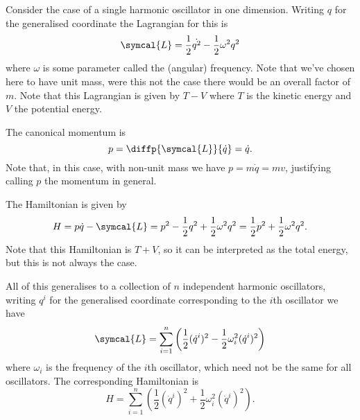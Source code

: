\documentclass[fleqn]{NotesClass}
\newcommand{\lagrangian}{\symcal{L}}
\begin{document}
    \begin{exm}{}{}
        Consider the case of a single harmonic oscillator in one dimension.
        Writing \(q\) for the generalised coordinate the Lagrangian for this is
        \begin{equation}
            \lagrangian = \frac{1}{2}\dot{q^2} - \frac{1}{2}\omega^2 q^2
        \end{equation}
        where \(\omega\) is some parameter called the (angular) frequency.
        Note that we've chosen here to have unit mass, were this not the case there would be an overall factor of \(m\).
        Note that this Lagrangian is given by \(T - V\) where \(T\) is the kinetic energy and \(V\) the potential energy.
        
        The canonical momentum is
        \begin{equation}
            p = \diffp{\lagrangian}{\dot{q}} = \dot{q}.
        \end{equation}
        Note that, in this case, with non-unit mass we have \(p = m\dot{q} = mv\), justifying calling \(p\) the momentum in general.
        
        The Hamiltonian is given by
        \begin{equation}
            H = p\dot{q} - \lagrangian = p^2 - \frac{1}{2}q^2 + \frac{1}{2}\omega^2q^2 = \frac{1}{2}p^2 + \frac{1}{2}\omega^2q^2.
        \end{equation}
        Note that this Hamiltonian is \(T + V\), so it can be interpreted as the total energy, but this is not always the case.
        
        All of this generalises to a collection of \(n\) independent harmonic oscillators, writing \(q^i\) for the generalised coordinate corresponding to the \(i\)th oscillator we have
        \begin{equation}
            \lagrangian = \sum_{i=1}^{n}\left( \frac{1}{2}(\dot{q}^i)^2 - \frac{1}{2} \omega^2_i (\dot{q}^i)^2 \right)
        \end{equation}
        where \(\omega_i\) is the frequency of the \(i\)th oscillator, which need not be the same for all oscillators.
        The corresponding Hamiltonian is
        \begin{equation}
            H = \sum_{i=1}^{n}\left( \frac{1}{2}(\dot{q}^i)^2 + \frac{1}{2} \omega^2_i (\dot{q}^i)^2 \right).
        \end{equation}
    \end{exm}
    
\end{document}

